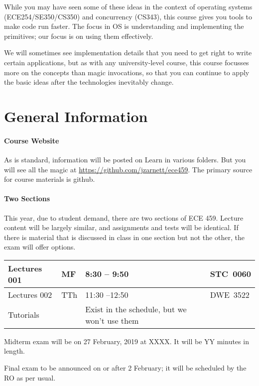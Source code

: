 \documentclass[letterpaper,10pt]{article}
\begin{document}
While you may have seen some of these ideas in the context of
operating systems (ECE254/SE350/CS350) and concurrency (CS343), this course gives you tools to make code run
faster. The focus in OS is understanding and implementing the
primitives; our focus is on using them effectively. 

We will sometimes see implementation details that you need to get right to write
certain applications, but as with any university-level course, this course
focusses more on the concepts than magic invocations, so that you can continue
to apply the basic ideas after the technologies inevitably change.


\section*{General Information}

\paragraph{Course Website} As is standard, information will be posted on Learn in various folders. But you will see all the magic at \url{https://github.com/jzarnett/ece459}. The primary source for course materials is github.


 \paragraph{Two Sections} This year, due to student demand, there are two sections of ECE 459. Lecture content will be largely similar, and assignments and tests will be identical. If there is material that is discussed in class in one section but not the other, the exam will offer options.


\noindent
\hspace*{2em} \begin{tabular}{l|l|l|l}
  Lectures 001 & MF & 8:30 -- 9:50 & STC~0060\\ \hline
  Lectures 002 & TTh & 11:30 --12:50 & DWE~3522\\ \hline
  Tutorials &  &  Exist in the schedule, but we won't use them& \\
  \end{tabular}
  
Midterm exam will be on 27 February, 2019 at XXXX. It will be YY minutes in length.
  
Final exam to be announced on or after 2 February; it will be scheduled by the RO as per usual.
\end{document}

